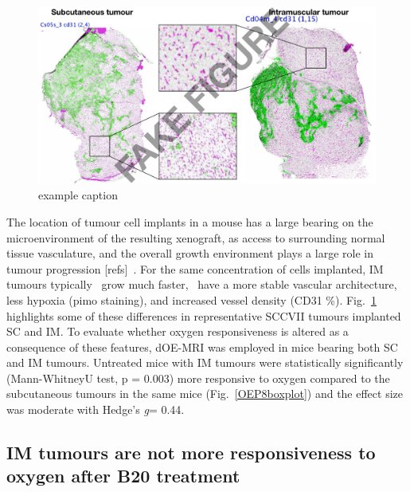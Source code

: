 \begin{figure}[htbp]
   \centering
   \includegraphics[width=\textwidth]{oemri_thesis3/oemri_thesis3-images/3_imsc_zoomed.png} %
   \caption{example caption}
   \label{imsc}
\end{figure}

The location of tumour cell implants in a mouse has a large bearing on the microenvironment of the resulting  xenograft, as access to surrounding normal tissue vasculature, and the overall growth environment plays a large role in tumour progression [refs]~. 
For the same concentration of cells implanted, IM tumours typically~ grow much faster,~ have a more stable vascular architecture, less hypoxia (pimo staining), and increased vessel density (CD31 \%).
Fig.~\ref{imsc} highlights some of these differences in representative SCCVII  tumours implanted SC and IM. 
To evaluate whether oxygen responsiveness is altered as a consequence of these features, dOE-MRI was employed in mice bearing both SC and IM tumours.
Untreated mice with IM tumours were statistically significantly (Mann-WhitneyU test, p = 0.003) more responsive to oxygen compared to the subcutaneous tumours in the same mice (Fig.~\ref{OEP8boxplot}) and the effect size was moderate with Hedge's \emph{g}= 0.44.

\subsection{IM tumours are not more responsiveness to oxygen after B20 treatment}

